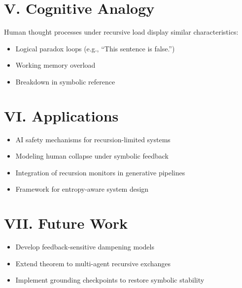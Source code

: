 \documentclass[12pt]{article}
\begin{document}
\section*{V. Cognitive Analogy}

Human thought processes under recursive load display similar characteristics:
\begin{itemize}
  \item Logical paradox loops (e.g., “This sentence is false.”)
  \item Working memory overload
  \item Breakdown in symbolic reference
\end{itemize}

\section*{VI. Applications}

\begin{itemize}
  \item AI safety mechanisms for recursion-limited systems
  \item Modeling human collapse under symbolic feedback
  \item Integration of recursion monitors in generative pipelines
  \item Framework for entropy-aware system design
\end{itemize}

\section*{VII. Future Work}

\begin{itemize}
  \item Develop feedback-sensitive dampening models
  \item Extend theorem to multi-agent recursive exchanges
  \item Implement grounding checkpoints to restore symbolic stability
\end{itemize}
\end{document}
